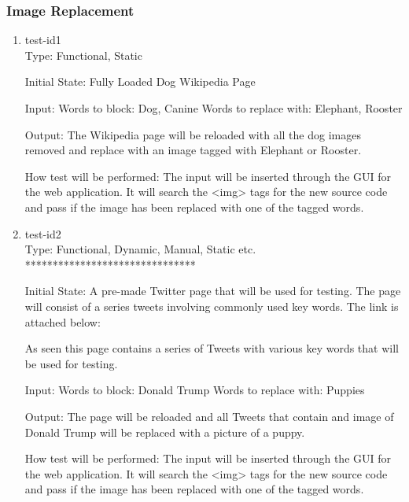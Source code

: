 \documentclass[12pt, titlepage]{article}
\begin{document}
\subsubsection{Image Replacement}
\begin{enumerate}
\item{test-id1\\}
Type: Functional, Static
					
Initial State: Fully Loaded Dog Wikipedia Page
					
Input: Words to block: Dog, Canine
Words to replace with: Elephant, Rooster
					
Output: The Wikipedia page will be reloaded with all the dog images removed and replace with an image tagged with Elephant or Rooster.
					
How test will be performed: The input will be inserted through the GUI for the web application. It will search the <img> %
tags for the new source code and pass if the image has been replaced with one of the tagged words. 
					
\item{test-id2\\}
Type: Functional, Dynamic, Manual, Static etc. *******************************
					
Initial State: A pre-made Twitter page that will be used for testing. The page will consist of  a series tweets involving commonly used key words. The link is attached below:

As seen this page contains a series of Tweets with various key words that will be used for testing.
					
Input:  Words to block: Donald Trump
Words to replace with: Puppies
					
Output: The page will be reloaded and all Tweets that contain and image of Donald Trump will be replaced with a picture of a puppy.

How test will be performed: The input will be inserted through the GUI for the web application. It will search the <img> tags for the new source code and pass if the image has been replaced with one of the tagged words. 
\end{enumerate}
\end{document}

